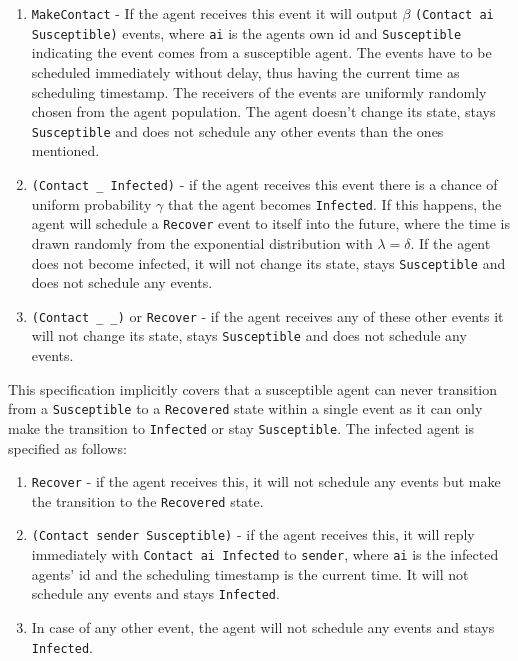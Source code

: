 \begin{enumerate}
	\item \texttt{MakeContact} - If the agent receives this event it will output $\beta$ \texttt{(Contact ai Susceptible)} events, where \texttt{ai} is the agents own id and \texttt{Susceptible} indicating the event comes from a susceptible agent. The events have to be scheduled immediately without delay, thus having the current time as scheduling timestamp. The receivers of the events are uniformly randomly chosen from the agent population. The agent doesn't change its state, stays \texttt{Susceptible} and does not schedule any other events than the ones mentioned.
	
	\item \texttt{(Contact \_ Infected)} - if the agent receives this event there is a chance of uniform probability $\gamma$ that the agent becomes \texttt{Infected}. If this happens, the agent will schedule a \texttt{Recover} event to itself into the future, where the time is drawn randomly from the exponential distribution with $\lambda = \delta$. If the agent does not become infected, it will not change its state, stays \texttt{Susceptible} and does not schedule any events.
	
	\item \texttt{(Contact \_ \_)} or \texttt{Recover} - if the agent receives any of these other events it will not change its state, stays \texttt{Susceptible} and does not schedule any events.
\end{enumerate}

This specification implicitly covers that a susceptible agent can never transition from a \texttt{Susceptible} to a \texttt{Recovered} state within a single event as it can only make the transition to \texttt{Infected} or stay \texttt{Susceptible}. The infected agent is specified as follows:

\begin{enumerate}
	\item \texttt{Recover} - if the agent receives this, it will not schedule any events but make the transition to the \texttt{Recovered} state.
	
	\item \texttt{(Contact sender Susceptible)} - if the agent receives this, it will reply immediately with \texttt{Contact ai Infected} to \texttt{sender}, where \texttt{ai} is the infected agents' id and the scheduling timestamp is the current time. It will not schedule any events and stays \texttt{Infected}.
	
	\item In case of any other event, the agent will not schedule any events and stays \texttt{Infected}.
\end{enumerate}

